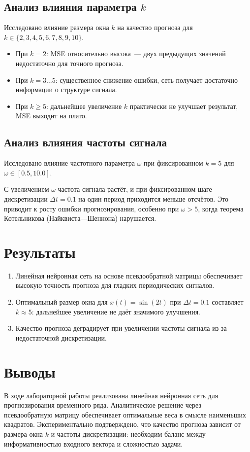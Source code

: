 \documentclass[14pt,a4paper]{extarticle}
\begin{document}
\subsection{Анализ влияния параметра $k$}

Исследовано влияние размера окна $k$ на качество прогноза для $k \in \{2, 3, 4, 5, 6, 7, 8, 9, 10\}$.

\begin{itemize}
\item При $k = 2$: MSE относительно высока~--- двух предыдущих значений недостаточно для точного прогноза.
\item При $k = 3 \ldots 5$: существенное снижение ошибки, сеть получает достаточно информации о структуре сигнала.
\item При $k \geq 5$: дальнейшее увеличение $k$ практически не улучшает результат, MSE выходит на плато.
\end{itemize}

\subsection{Анализ влияния частоты сигнала}

Исследовано влияние частотного параметра $\omega$ при фиксированном $k = 5$ для $\omega \in [0.5, 10.0]$.

С увеличением $\omega$ частота сигнала растёт, и при фиксированном шаге дискретизации $\Delta t = 0.1$ на один период приходится меньше отсчётов. Это приводит к росту ошибки прогнозирования, особенно при $\omega > 5$, когда теорема Котельникова (Найквиста---Шеннона) нарушается.

\section{Результаты}

\begin{enumerate}
\item Линейная нейронная сеть на основе псевдообратной матрицы обеспечивает высокую точность прогноза для гладких периодических сигналов.
\item Оптимальный размер окна для $x(t) = \sin(2t)$ при $\Delta t = 0.1$ составляет $k \approx 5$: дальнейшее увеличение не даёт значимого улучшения.
\item Качество прогноза деградирует при увеличении частоты сигнала из-за недостаточной дискретизации.
\end{enumerate}



\section{Выводы}

В ходе лабораторной работы реализована линейная нейронная сеть для прогнозирования временного ряда. Аналитическое решение через псевдообратную матрицу обеспечивает оптимальные веса в смысле наименьших квадратов. Экспериментально подтверждено, что качество прогноза зависит от размера окна $k$ и частоты дискретизации: необходим баланс между информативностью входного вектора и сложностью задачи.


\end{document}
